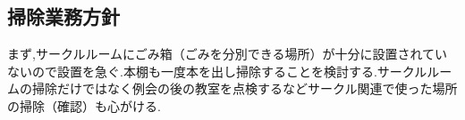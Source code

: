 \subsection*{掃除業務方針}


まず,サークルルームにごみ箱（ごみを分別できる場所）が十分に設置されていないので設置を急ぐ.本棚も一度本を出し掃除することを検討する.サークルルームの掃除だけではなく例会の後の教室を点検するなどサークル関連で使った場所の掃除（確認）も心がける.

